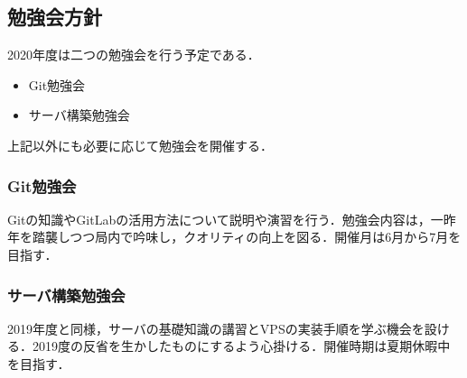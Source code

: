 \subsection*{勉強会方針}


2020年度は二つの勉強会を行う予定である．
 \begin{itemize}
\item Git勉強会
\item サーバ構築勉強会
 \end{itemize}
上記以外にも必要に応じて勉強会を開催する．

\subsubsection*{Git勉強会}
Gitの知識やGitLabの活用方法について説明や演習を行う．勉強会内容は，一昨年を踏襲しつつ局内で吟味し，クオリティの向上を図る．開催月は6月から7月を目指す．
\subsubsection*{サーバ構築勉強会}
2019年度と同様，サーバの基礎知識の講習とVPSの実装手順を学ぶ機会を設ける．2019度の反省を生かしたものにするよう心掛ける．開催時期は夏期休暇中を目指す．


